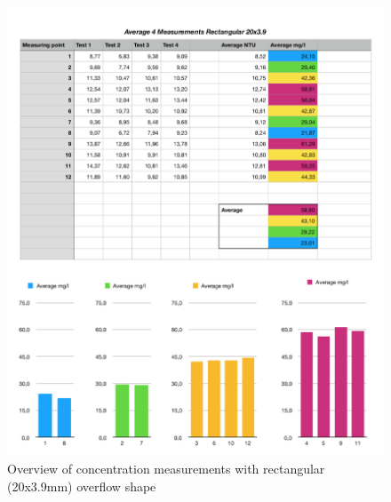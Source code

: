 \begin{figure}[ht]
    \centering
    \includegraphics[width=\linewidth]{Images/Average_Rec20.png}
    \caption{Overview of concentration measurements with rectangular (20x3.9mm) overflow shape}
\end{figure}

